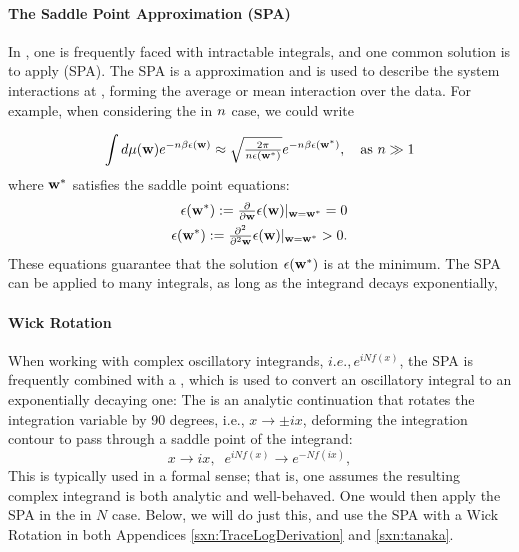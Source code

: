 \paragraph{The Saddle Point Approximation (SPA) }In \STATMECH, one is frequently faced with intractable integrals, and one common solution is to apply \SaddlePointApproximation (SPA). The SPA is a \LargeN approximation and is used to describe the system interactions at \LargeN, forming the average or mean interaction over the data.
For example, when considering the \LargeN in $n$ case, we could write

\begin{align}
  \label{eqn:SPA}
  \int d\mu({\mathbf{w}}) e^{-n\beta\epsilon({\mathbf{w}})}\approx \sqrt{\tfrac{2\pi}{n\epsilon({\mathbf{w}}^{*})}} e^{-n\beta\epsilon({\mathbf{w}}^{*})}  
  , \quad \text{as } n \gg 1
\end{align}
where ${\mathbf{w}}^{*}$ satisfies the saddle point equations:
\begin{align}
  \epsilon({\mathbf{w}}^{*}):=\tfrac{\partial}{\partial {\mathbf{w}}}\epsilon({\mathbf{w}})\vert_{{\mathbf{w}}={\mathbf{w}}^{*}}=0 \\
  \epsilon({\mathbf{w}}^{*}):=\tfrac{\partial^{2}}{\partial^{2} {\mathbf{w}}}\epsilon({\mathbf{w}})\vert_{{\mathbf{w}}={\mathbf{w}}^{*}}>0  .
\end{align}
These equations guarantee that the solution $\epsilon({\mathbf{w}}^{*})$ is at the minimum.
The SPA can be applied to many \LargeN integrals, as long as the integrand decays exponentially,  

\paragraph{Wick Rotation} When working with complex oscillatory integrands, $i.e., e^{iNf(x)}$,   
the SPA is frequently combined with a \emph{\WickRotation}, 
which is used to convert an oscillatory integral to an exponentially decaying one:
The \WickRotation is an analytic continuation that rotates the integration variable by 90 degrees, i.e., $x \to \pm i x$, deforming the integration contour to pass through a saddle point of the integrand:
\begin{equation}
x\rightarrow ix,\;\;e^{iNf(x)}\rightarrow e^{-Nf(ix)},
\end{equation}
This is typically used in a formal sense; that is, one assumes the resulting complex integrand is both analytic and well-behaved.
One would then apply the SPA in the \LargeN in $N$ case.
Below, we will do just this, and  use the SPA with a Wick Rotation in both Appendices \ref{sxn:TraceLogDerivation} and \ref{sxn:tanaka}.

